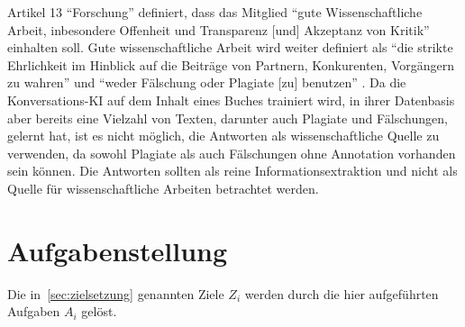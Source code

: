 Artikel 13 \enquote{Forschung} definiert, dass das Mitglied \enquote{gute Wissenschaftliche Arbeit, inbesondere Offenheit und Transparenz [und] Akzeptanz von Kritik} \citep{gmds_eth} einhalten soll. 
Gute wissenschaftliche Arbeit wird weiter definiert als 
\enquote{die strikte Ehrlichkeit im Hinblick auf die Beiträge von Partnern, Konkurenten, Vorgängern zu wahren} und \enquote{weder Fälschung oder Plagiate [zu] benutzen} \citep{gmds_eth}.
Da die Konversations-KI auf dem Inhalt eines Buches trainiert wird, in ihrer Datenbasis aber bereits eine Vielzahl von Texten, darunter auch Plagiate und Fälschungen, gelernt hat, 
ist es nicht möglich, die Antworten als wissenschaftliche Quelle zu verwenden, da sowohl Plagiate als auch Fälschungen ohne Annotation vorhanden sein können.
Die Antworten sollten als reine Informationsextraktion und nicht als Quelle für wissenschaftliche Arbeiten betrachtet werden.

\section{Aufgabenstellung}

Die in~\ref{sec:zielsetzung} genannten Ziele $Z_i$ werden durch die hier aufgeführten Aufgaben $A_i$ gelöst.


